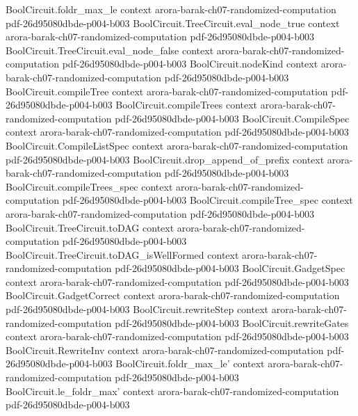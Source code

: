\begin{theorem}
\proofstep
  {BoolCircuit.foldr_max_le}
  {context}
  {arora-barak-ch07-randomized-computation}
  {pdf-26d95080dbde-p004-b003}
\proofstep
  {BoolCircuit.TreeCircuit.eval_node_true}
  {context}
  {arora-barak-ch07-randomized-computation}
  {pdf-26d95080dbde-p004-b003}
\proofstep
  {BoolCircuit.TreeCircuit.eval_node_false}
  {context}
  {arora-barak-ch07-randomized-computation}
  {pdf-26d95080dbde-p004-b003}
\proofstep
  {BoolCircuit.nodeKind}
  {context}
  {arora-barak-ch07-randomized-computation}
  {pdf-26d95080dbde-p004-b003}
\proofstep
  {BoolCircuit.compileTree}
  {context}
  {arora-barak-ch07-randomized-computation}
  {pdf-26d95080dbde-p004-b003}
\proofstep
  {BoolCircuit.compileTrees}
  {context}
  {arora-barak-ch07-randomized-computation}
  {pdf-26d95080dbde-p004-b003}
\proofstep
  {BoolCircuit.CompileSpec}
  {context}
  {arora-barak-ch07-randomized-computation}
  {pdf-26d95080dbde-p004-b003}
\proofstep
  {BoolCircuit.CompileListSpec}
  {context}
  {arora-barak-ch07-randomized-computation}
  {pdf-26d95080dbde-p004-b003}
\proofstep
  {BoolCircuit.drop_append_of_prefix}
  {context}
  {arora-barak-ch07-randomized-computation}
  {pdf-26d95080dbde-p004-b003}
\proofstep
  {BoolCircuit.compileTrees_spec}
  {context}
  {arora-barak-ch07-randomized-computation}
  {pdf-26d95080dbde-p004-b003}
\proofstep
  {BoolCircuit.compileTree_spec}
  {context}
  {arora-barak-ch07-randomized-computation}
  {pdf-26d95080dbde-p004-b003}
\proofstep
  {BoolCircuit.TreeCircuit.toDAG}
  {context}
  {arora-barak-ch07-randomized-computation}
  {pdf-26d95080dbde-p004-b003}
\proofstep
  {BoolCircuit.TreeCircuit.toDAG_isWellFormed}
  {context}
  {arora-barak-ch07-randomized-computation}
  {pdf-26d95080dbde-p004-b003}
\proofstep
  {BoolCircuit.GadgetSpec}
  {context}
  {arora-barak-ch07-randomized-computation}
  {pdf-26d95080dbde-p004-b003}
\proofstep
  {BoolCircuit.GadgetCorrect}
  {context}
  {arora-barak-ch07-randomized-computation}
  {pdf-26d95080dbde-p004-b003}
\proofstep
  {BoolCircuit.rewriteStep}
  {context}
  {arora-barak-ch07-randomized-computation}
  {pdf-26d95080dbde-p004-b003}
\proofstep
  {BoolCircuit.rewriteGates}
  {context}
  {arora-barak-ch07-randomized-computation}
  {pdf-26d95080dbde-p004-b003}
\proofstep
  {BoolCircuit.RewriteInv}
  {context}
  {arora-barak-ch07-randomized-computation}
  {pdf-26d95080dbde-p004-b003}
\proofstep
  {BoolCircuit.foldr_max_le'}
  {context}
  {arora-barak-ch07-randomized-computation}
  {pdf-26d95080dbde-p004-b003}
\proofstep
  {BoolCircuit.le_foldr_max'}
  {context}
  {arora-barak-ch07-randomized-computation}
  {pdf-26d95080dbde-p004-b003}

\end{theorem}
